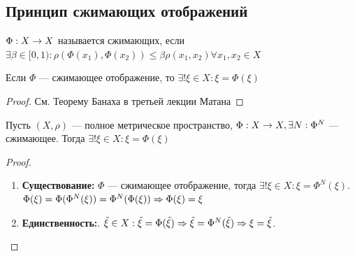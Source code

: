 \subsection{Принцип сжимающих отображений}
\begin{definition}
	\(\Phi: X \rightarrow X\) называется сжимающих, если \(\exists \beta \in [0, 1): \rho(\Phi(x_1), \Phi(x_2)) \le \beta\rho(x_1, x_2) \forall x_1, x_2 \in X\)
\end{definition}

\begin{proposition}
	Если \(\Phi\) --- сжимающее отображение, то \(\exists ! \xi \in X: \xi = \Phi(\xi)\)
\end{proposition}
\begin{proof}
	См. Теорему Банаха в третьей лекции Матана
\end{proof}

\begin{corollary}
	Пусть \((X, \rho)\) --- полное метрическое пространство, \(\Phi: X \rightarrow X, \exists N: \Phi^N\) --- сжимающее. Тогда \(\exists ! \xi \in X: \xi = \Phi(\xi)\)
\end{corollary}
\begin{proof}
	\begin{enumerate}
		\item[] \textbf{Существование:} \(\Phi\) --- сжимающее отображение, тогда \(\exists! \xi \in X: \xi = \Phi^N(\xi)\). \(\Phi(\xi) = \Phi(\Phi^N(\xi)) = \Phi^N(\Phi(\xi)) \Rightarrow \Phi(\xi) = \xi\)
		\item[] \textbf{Единственность:}. \(\tilde{\xi} \in X: \tilde{\xi} = \Phi(\tilde{\xi}) \Rightarrow \tilde{\xi} = \Phi^N(\tilde{\xi}) \Rightarrow \xi = \tilde{\xi}\).
	\end{enumerate}
\end{proof}
